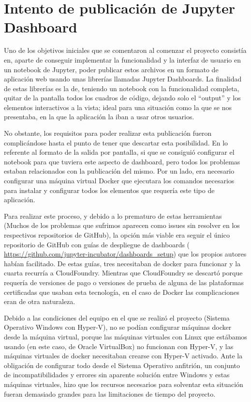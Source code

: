 \section{Intento de publicación de Jupyter Dashboard}

Uno de los objetivos iniciales que se comentaron al comenzar el proyecto consistía en, aparte de conseguir implementar la funcionalidad y la interfaz de usuario en un notebook de Jupyter, poder publicar estos archivos en un formato de aplicación web usando unas librerías llamadas Jupyter Dashboards. La finalidad de estas librerías es la de, teniendo un notebook con la funcionalidad completa, quitar de la pantalla todos los cuadros de código, dejando solo el ``output'' y los elementos interactivos a la vista; ideal para una situación como la que se nos presentaba, en la que la aplicación la iban a usar otros usuarios.

No obstante, los requisitos para poder realizar esta publicación fueron complicándose hasta el punto de tener que descartar esta posibilidad. En lo referente al formato de la salida por pantalla, si que se consiguió configurar el notebook para que tuviera este aspecto de dashboard, pero todos los problemas estaban relacionados con la publicación del mismo. Por un lado, era necesario configurar una máquina virtual Docker que ejecutara los comandos necesarios para instalar y configurar todos los elementos que requería este tipo de aplicación. 

Para realizar este proceso, y debido a lo prematuro de estas herramientas (Muchos de los problemas que sufrimos aparecen como issues sin resolver en los respectivos repositorios de GitHub), la opción más viable era seguir el único repositorio de GitHub con guías de despliegue de dashboards (\url{ https://github.com/jupyter-incubator/dashboards_setup}) que los propios autores habían facilitado. De estas guías, tres necesitaban de docker para funcionar y la cuarta recurría a CloudFoundry. Mientras que CloudFoundry se descartó porque requería de versiones de pago o versiones de prueba de alguna de las plataformas certificadas que usaban esta tecnología, en el caso de Docker las complicaciones eran de otra naturaleza.

Debido a las condiciones del equipo en el que se realizó el proyecto (Sistema Operativo Windows con Hyper-V), no se podían configurar máquinas docker desde la máquina virtual, porque las máquinas virtuales con Linux que estábamos usando (en este caso, de Oracle VirtualBox) no funcionan con Hyper-V, y las máquinas virtuales de docker necesitaban crearse con Hyper-V activado. Ante la obligación de configurar todo desde el Sistema Operativo anfitrión, un conjunto de incompatibilidades y errores sin aparente solución entre Windows y estas máquinas virtuales, hizo que los recursos necesarios para solventar esta situación fueran demasiado grandes para las limitaciones de tiempo del proyecto.


